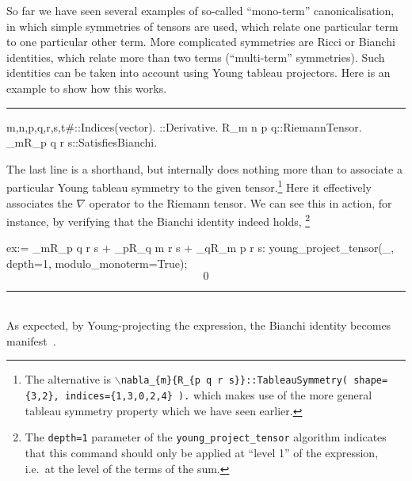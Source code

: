 \documentclass[11pt]{article}
\newenvironment{hanging}
    {\begin{list}{}{\setlength\itemsep{0pt}%
 \setlength\topsep{0pt}%
 \setlength\leftmargin{25pt}%
 \setlength\itemindent{0pt}%
 \setlength\listparindent{\itemindent}}%
     \item[]}
    {\end{list}}
\newcommand{\toprule}{\par\vspace{1ex}\noindent\hspace{25pt}\rule{435pt}{.1pt}}
\newcommand{\botrule}{\noindent\hspace{25pt}\rule{435pt}{.1pt}\\[2ex]}
\newenvironment{cdbin}{\fvset{firstnumber=1}\color[named]{Blue}\Verbatim}{\endVerbatim}
\newenvironment{cdbcont}{\fvset{firstnumber=last}\color[named]{Blue}\Verbatim}{\endVerbatim}
\newenvironment{cdbout}{\vspace{-1.4ex}\begin{equation}}{\end{equation}\vspace{-1.4ex}}
\newenvironment{cdbcom}{\begin{hanging}}{\end{hanging}}
\begin{document}
So far we have seen several examples of so-called ``mono-term''
canonicalisation, in which simple symmetries of tensors are used,
which relate one particular term to one particular other term. More
complicated symmetries are Ricci or Bianchi identities, which relate
more than two terms (``multi-term'' symmetries). Such identities can
be taken into account using Young tableau projectors. Here is an
example to show how this works.  
\toprule
\begin{cdbin}
{m,n,p,q,r,s,t#}::Indices(vector).
\nabla{#}::Derivative.
R_{m n p q}::RiemannTensor.
\nabla_{m}{R_{p q r s}}::SatisfiesBianchi.
\end{cdbin}
\begin{cdbcom}
The last line is a shorthand, but internally does nothing more than to
associate a particular Young tableau symmetry to the given
tensor.\footnote{The alternative is
{\tt $\backslash$nabla\_\{m\}\{R\_\{p q r s\}\}::TableauSymmetry( shape=\{3,2\}, indices=\{1,3,0,2,4\} ).} 
which makes use of the more general tableau symmetry property which we
have seen earlier.} Here it effectively associates the $\nabla$
operator to the Riemann tensor. We can see this in action, for
instance, by verifying that the Bianchi identity indeed holds,
\footnote{The {\tt depth=1} parameter of the
  {\tt young\_project\_tensor} algorithm indicates that this command
  should only be applied at ``level 1'' of the expression, i.e.~at the
  level of the terms of the sum.}
\end{cdbcom}
\begin{cdbcont}
ex:= \nabla_{m}{R_{p q r s}} + \nabla_{p}{R_{q m r s}} + \nabla_{q}{R_{m p r s}}:
young_project_tensor(_, depth=1, modulo_monoterm=True);
\end{cdbcont}
\begin{cdbout}
0
\end{cdbout}
\botrule
As expected, by Young-projecting the expression, the Bianchi identity
becomes manifest~\cite{Green:2005qr}.
\end{document}
